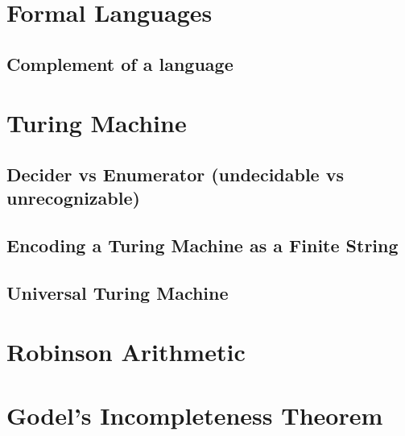 \documentclass[
11pt,notheorems,hyperref={pdfauthor=whatever}
]{beamer}
\begin{document}

\section{Formal Languages}
\begin{frame}
\end{frame}

\subsection{Complement of a language}
\begin{frame}
\end{frame}

\section{Turing Machine}
\begin{frame}
\end{frame}

\subsection{Decider vs Enumerator (undecidable vs unrecognizable)}
\begin{frame}
\end{frame}

\subsection{Encoding a Turing Machine as a Finite String}
\begin{frame}
\end{frame}

\subsection{Universal Turing Machine}
\begin{frame}
\end{frame}

\section{Robinson Arithmetic}
\begin{frame}
\end{frame}

\section{Godel's Incompleteness Theorem}
\begin{frame}
\end{frame}
\end{document}
